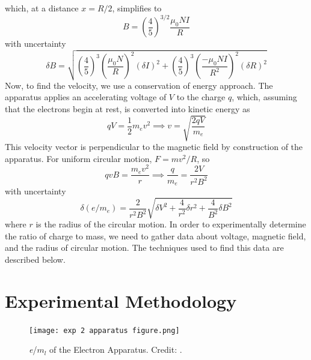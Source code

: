 \documentclass[prX,nofootinbib,notitlepage]{revtex4-1}
\begin{document}
which, at a distance $x = R/2$, simplifies to 
\begin{equation} \label{Magnetic Field Equation}
B = \left(\frac{4}{5}\right)^{3/2} \frac{\mu_{0} N I}{R}
\end{equation}
with uncertainty
\begin{equation} \label{Magnetic Field Uncertainty}
\delta B = \sqrt{\left(\frac{4}{5}\right)^{3} \left(\frac{\mu_{0} N }{R}\right)^{2} (\delta I)^{2} + \left(\frac{4}{5}\right)^{3} \left(\frac{- \mu_{0} N I}{R^{2}}\right)^{2} (\delta R)^{2}} 
\end{equation}
Now, to find the velocity, we use a conservation of energy approach. The apparatus applies an accelerating voltage of $V$ to the charge $q$, which, assuming that the electrons begin at rest, is converted into kinetic energy as
\begin{equation}
qV = \frac{1}{2} m_{e}v^{2} \implies v = \sqrt{\frac{2qV}{m_{e}}}
\end{equation}
This velocity vector is perpendicular to the magnetic field by construction of the apparatus. For uniform circular motion, $F = mv^{2}/R$, so
\begin{equation} \label{Charge to Mass Equation}
qvB = \frac{m_{e} v^2 }{r} \implies \frac{q}{m_e} = \frac{2V}{r^2 B^2}
\end{equation}
with uncertainty 
\begin{equation} \label{Charge to Mass Uncertainty}
\delta (e/m_e) = \frac{2}{r^2 B^2} \sqrt{\delta V^2 + \frac{4}{r^2 }\delta r^2 + \frac{4}{B^2 } \delta B^2}
\end{equation}
where $r$ is the radius of the circular motion. In order to experimentally determine the ratio of charge to mass, we need to gather data about voltage, magnetic field, and the radius of circular motion. The techniques used to find this data are described below.


\section{Experimental Methodology}

\begin{figure}[ht]
        \centering
        \texttt{[image: exp 2 apparatus figure.png]}
        \caption{\textit{e}/\textit{$m_l$} of the Electron Apparatus. Credit: \cite{PHYS506}.}
        \label{fig:apparatus}
\end{figure}
\end{document}

